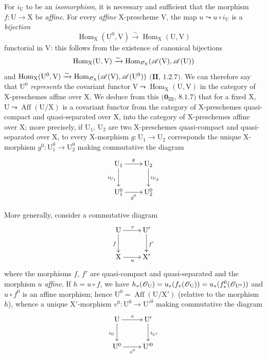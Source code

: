 \begin{env}[21.12.1]
For $i_{\mathrm{U}}$ to be an \emph{isomorphism}, it is necessary and sufficient that the morphism $f:\mathrm{U}\to\mathrm{X}$ be \emph{affine}.
For every \emph{affine} $\mathrm{X}$-prescheme $\mathrm{V}$, the map $u\leadsto u\circ i_{\mathrm{U}}$ is a \emph{bijection}
\[
  \operatorname{Hom}_{\mathrm{X}}(\mathrm{U}^0,\mathrm{V})\xrightarrow{\sim}\operatorname{Hom}_{\mathrm{X}}(\mathrm{U},\mathrm{V})
\]
functorial in $\mathrm{V}$: this follows from the existence of canonical bijections
\[
  \operatorname{Hom}_{\mathrm{X}}(\mathrm{U},\mathrm{V})\xrightarrow{\sim}\operatorname{Hom}_{\mathscr{O}_{\mathrm{X}}}(\mathscr{A}(\mathrm{V}),\mathscr{A}(\mathrm{U}))
\]
and $\operatorname{Hom}_{\mathrm{X}}(\mathrm{U}^0,\mathrm{V})\xrightarrow{\sim}\operatorname{Hom}_{\mathscr{O}_{\mathrm{X}}}(\mathscr{A}(\mathrm{V}),\mathscr{A}(\mathrm{U}^0))$ $(\mathbf{II}$, $1.2.7)$.
We can therefore say that $\mathrm{U}^0$ \emph{represents} the covariant functor $\mathrm{V}\leadsto\operatorname{Hom}_{\mathrm{X}}(\mathrm{U},\mathrm{V})$ in the category of X-preschemes affine over $\mathrm{X}$.
We deduce from this $(\mathbf{0}_{\mathrm{III}}$, $8.1.7)$ that for a fixed $\mathrm{X}$, $\mathrm{U}\leadsto\operatorname{Aff}(\mathrm{U}/\mathrm{X})$ is a covariant functor from the category of $\mathrm{X}$-preschemes quasi-compact and quasi-separated over $\mathrm{X}$, into the category of $\mathrm{X}$-preschemes affine over $\mathrm{X}$; more precisely, if $\mathrm{U}_1$, $\mathrm{U}_2$ are two $\mathrm{X}$-preschemes quasi-compact and quasi-separated over $\mathrm{X}$, to every $\mathrm{X}$-morphism $g:\mathrm{U}_1\to\mathrm{U}_2$ corresponds the unique $\mathrm{X}$-morphism $g^0:\mathrm{U}_1^0\to\mathrm{U}_2^0$ making commutative the diagram
\[
  \xymatrix{
    \mathrm{U}_1 \ar[r]^g \ar[d]_{i_{\mathrm{U}_1}} & \mathrm{U}_2 \ar[d]^{i_{\mathrm{U}_2}} \\
    \mathrm{U}_1^0 \ar[r]_{g^0} & \mathrm{U}_2^0
  }
\]
\end{env}

More generally, consider a commutative diagram
\[
  \xymatrix{
    \mathrm{U} \ar[r]^v \ar[d]_f & \mathrm{U}' \ar[d]^{f'} \\
    \mathrm{X} \ar[r]_u & \mathrm{X}'
  }
\]
where the morphisms $f$, $f'$ are quasi-compact and quasi-separated and the morphism $u$ \emph{affine}.
If $h=u\circ f$, we have $h_*(\mathscr{O}_{\mathrm{U}})=u_*(f_*(\mathscr{O}_{\mathrm{U}}))=u_*(f_*^{0}(\mathscr{O}_{\mathrm{U}^0}))$ and $u\circ f^0$ is an affine morphism; hence $\mathrm{U}^0=\operatorname{Aff}(\mathrm{U}/\mathrm{X}')$ (relative to the morphism $h$), whence a unique $\mathrm{X}'$-morphism $v^0:\mathrm{U}^0\to\mathrm{U}'^0$ making commutative the diagram
\[
  \xymatrix{
    \mathrm{U} \ar[r]^v \ar[d]_{i_{\mathrm{U}}} & \mathrm{U}' \ar[d]^{i_{\mathrm{U}'}} \\
    \mathrm{U}^0 \ar[r]_{v^0} & \mathrm{U}'^0
  }
\]

